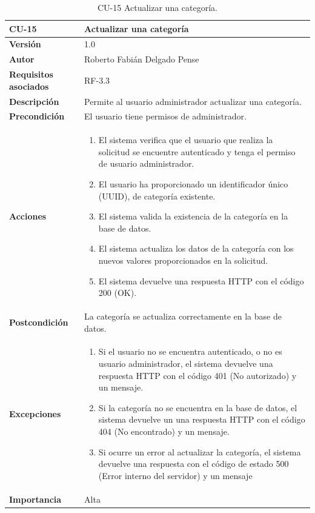 \begin{table}[p]
	\centering
	\begin{tabularx}{\linewidth}{ p{} p{} }
		\toprule
		\textbf{CU-15}    & \textbf{Actualizar una categoría}\\
		\toprule
		\textbf{Versión}              & 1.0    \\
		\textbf{Autor}                & Roberto Fabián Delgado Pense \\
		\textbf{Requisitos asociados} & RF-3.3 \\ 
		\textbf{Descripción}          & Permite al usuario administrador actualizar una categoría. \\
		\textbf{Precondición}         & El usuario tiene permisos de administrador. \\
		\textbf{Acciones}             &
		\begin{enumerate}
			\def\labelenumi{\arabic{enumi}.}
			\tightlist
                \item El sistema verifica que el usuario que realiza la solicitud se encuentre autenticado y tenga el permiso de usuario administrador.
			\item El usuario ha proporcionado un identificador único (UUID), de categoría existente.
			\item El sistema valida la existencia de la categoría en la base de datos.
                \item El sistema actualiza los datos de la categoría con los nuevos valores proporcionados en la solicitud.
                \item El sistema devuelve una respuesta HTTP con el código 200 (OK).
            \end{enumerate}\\
		\textbf{Postcondición}        & La categoría se actualiza correctamente en la base de datos.\\
		\textbf{Excepciones}          & 
            \begin{enumerate}
			\def\labelenumi{\arabic{enumi}.}
			\tightlist
   			\item Si el usuario no se encuentra autenticado, o no es usuario administrador, el sistema devuelve una                 respuesta HTTP con el código 401 (No autorizado) y un mensaje.
                \item   Si la categoría no se encuentra en la base de datos, el sistema devuelve un                           una respuesta HTTP con el código 404 (No encontrado) y un mensaje. 
                \item Si ocurre un error al actualizar la categoría, el sistema devuelve una respuesta con el código de estado 500 (Error interno del servidor) y un mensaje
            \end{enumerate}\\
		\textbf{Importancia}          & Alta \\
		\bottomrule
	\end{tabularx}
	\caption{CU-15 Actualizar una categoría.}
\end{table}

